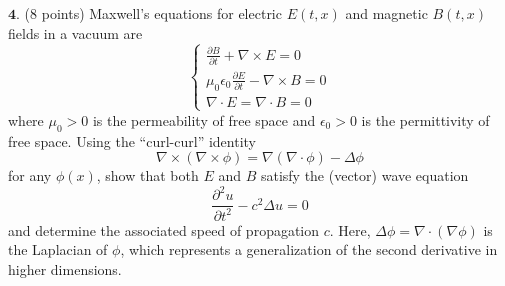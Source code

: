 \documentclass[12pt]{article}
\begin{document}
\noindent $\textbf{4}$. (8 points) Maxwell's equations for electric $E(t,x)$ and magnetic $B(t,x)$ fields in a vacuum are
$$
\left \{
\begin{gathered}
\frac{\partial B}{\partial t} + \nabla \times E = 0\\
\mu_0\epsilon_0\frac{\partial E}{\partial t} - \nabla \times B = 0\\
\nabla \cdot E =\nabla \cdot B = 0
\end{gathered} 
\right.
$$
where $\mu_0> 0$ is the permeability of free space and
$\epsilon_0>0$ is the permittivity of free space.
Using the ``curl-curl'' identity
$$ \nabla \times \left (\nabla \times \phi \right ) = \nabla \left ( \nabla \cdot \phi \right ) - \Delta \phi$$
for any $\phi(x)$,
show that both $E$ and $B$ satisfy the (vector) wave equation 
$$\frac{\partial^2 u}{\partial t^2} -c^2 \Delta u = 0$$
and determine the associated speed of propagation $c$.
Here, $\Delta \phi = \nabla \cdot (\nabla \phi)$ is the Laplacian of $\phi$, which represents a generalization of the second derivative in higher dimensions. \\ \\
\end{document}
